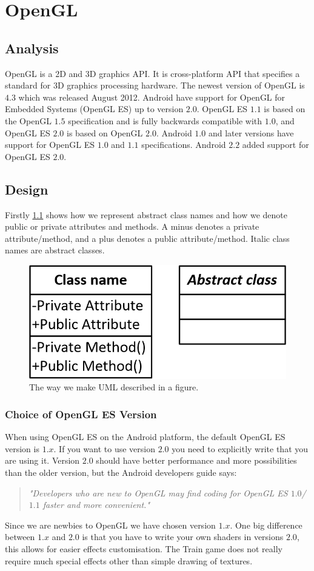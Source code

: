 \chapter{OpenGL}

\section{Analysis}
OpenGL is a 2D and 3D graphics API. It is cross-platform API that specifies a standard for 3D graphics processing hardware. The newest version of OpenGL is $4.3$ which was released August 2012. Android have support for OpenGL for Embedded Systems (OpenGL ES) up to version $2.0$. OpenGL ES $1.1$ is based on the OpenGL $1.5$ specification and is fully backwards compatible with $1.0$, and OpenGL ES $2.0$ is based on OpenGL $2.0$. Android $1.0$ and later versions have support for OpenGL ES $1.0$ and $1.1$ specifications. Android $2.2$ added support for OpenGL ES $2.0$. \citep{androidopengl, khronosopengl, khronosopengles}

\section{Design}
Firstly \ref{fig:terminology} shows how we represent abstract class names and how we denote public or private attributes and methods. A minus denotes a private attribute/method, and a plus denotes a public attribute/method. Italic class names are abstract classes. 
\begin{figure}[H]
\centering
\includegraphics[width=0.4\linewidth]{img/terminology.png}%
\caption{The way we make UML described in a figure.}
\label{fig:terminology}
\end{figure}

\subsection*{Choice of OpenGL ES Version}
When using OpenGL ES on the Android platform, the default OpenGL ES version is $1.x$. If you want to use version $2.0$ you need to explicitly write that you are using it. Version $2.0$ should have better performance and more possibilities than the older version, but the Android developers guide says:
\begin{quote}
\textit{"Developers who are new to OpenGL may find coding for OpenGL ES $1.0$/$1.1$ faster and more convenient."} \citep{androidopengl}
\end{quote}
Since we are newbies to OpenGL we have chosen version $1.x$. One big difference between $1.x$ and $2.0$ is that you have to write your own shaders in versions $2.0$, this allows for easier effects customisation. The Train game does not really require much special effects other than simple drawing of textures.


